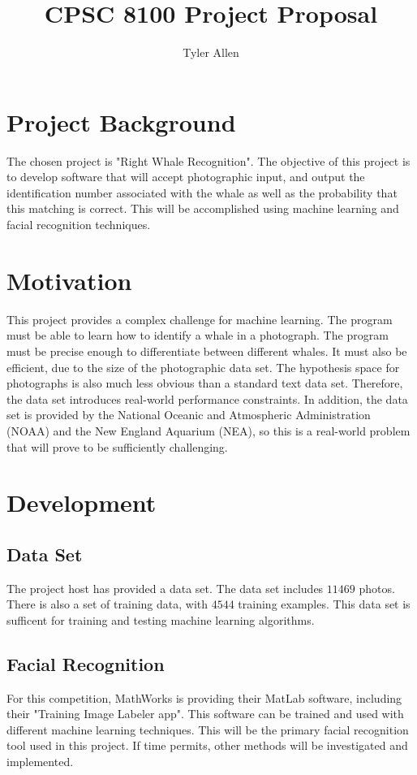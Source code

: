 \documentclass[11pt]{article}
\newcommand{\?}{\stackrel{?}{=}}
\begin{document}
\title{CPSC 8100 Project Proposal}
\date{}
\author{Tyler Allen}
\maketitle

\doublespacing

\section{Project Background}
The chosen project is "Right Whale Recognition"\cite{kaggle_desc}. The objective of
this project is to develop software that will accept photographic input, and 
output the identification number associated with the whale as well as the probability
that this matching is correct. This will be accomplished using machine learning 
and facial recognition techniques. 

\section{Motivation}
This project provides a complex challenge for machine learning. The program
must be able to learn how to identify a whale in a photograph. The program must
be precise enough to differentiate between different whales. It must also be efficient, due to the
size of the photographic data set. The hypothesis space for photographs is also
much less obvious than a standard text data set. Therefore, the data set introduces real-world performance
constraints. In addition, the data set is provided by the National Oceanic and 
Atmospheric Administration (NOAA) and the New England Aquarium (NEA), so this is a real-world problem that will 
prove to be sufficiently challenging\cite{kaggle_desc}\cite{NOAA}\cite{NEA}.
 
 \newpage
\section{Development}

\subsection{Data Set}
The project host has provided a data set\cite{kaggle_data}. The data set includes 
$11469$ photos. There is also a set of training data, with $4544$ training examples.
This data set is sufficent for training and testing machine learning algorithms. 

\subsection{Facial Recognition}
For this competition, MathWorks is providing their MatLab software, including
their "Training Image Labeler app"\cite{kaggle_face}\cite{math_training}. This 
software can be trained and used with different machine learning techniques\cite{kaggle_face}\cite{math_cascade}. 
This will be the primary facial recognition tool used in this project. If time
permits, other methods will be investigated and implemented.
\end{document}
